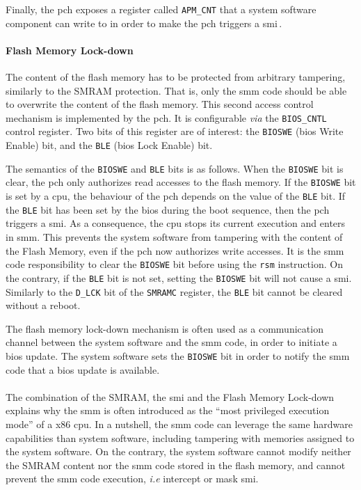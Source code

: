 Finally, the \ac{pch} exposes a register called \texttt{APM\_CNT} that a system
software component can write to in order to make the \ac{pch} triggers a
\ac{smi}\,\cite{intel2012pch}.

\paragraph{Flash Memory Lock-down}
%
The content of the flash memory has to be protected from arbitrary tampering,
similarly to the SMRAM protection.
%
That is, only the \ac{smm} code should be able to overwrite the content of the
flash memory.
%
This second access control mechanism is implemented by the \ac{pch}.
%
It is configurable \emph{via} the \texttt{BIOS\_CNTL} control register.
%
Two bits of this register are of interest: the \texttt{BIOSWE} (\ac{bios} Write
Enable) bit, and the \texttt{BLE} (\ac{bios} Lock Enable) bit.

The semantics of the \texttt{BIOSWE} and \texttt{BLE} bits is as follows.
%
When the \texttt{BIOSWE} bit is clear, the \ac{pch} only authorizes read
accesses to the flash memory.
%
If the \texttt{BIOSWE} bit is set by a \ac{cpu}, the behaviour of the \ac{pch}
depends on the value of the \texttt{BLE} bit.
%
If the \texttt{BLE} bit has been set by the \ac{bios} during the boot sequence,
then the \ac{pch} triggers a \ac{smi}.
%
As a consequence, the \ac{cpu} stops its current execution and enters in
\ac{smm}.
%
This prevents the system software from tampering with the content of the Flash
Memory, even if the \ac{pch} now authorizes write accesses.
%
It is the \ac{smm} code responsibility to clear the \texttt{BIOSWE} bit before
using the \texttt{rsm} instruction.
%
On the contrary, if the \texttt{BLE} bit is not set, setting the \texttt{BIOSWE}
bit will not cause a \ac{smi}.
%
Similarly to the \texttt{D\_LCK} bit of the \texttt{SMRAMC} register, the
\texttt{BLE} bit cannot be cleared without a reboot.


The flash memory lock-down mechanism is often used as a communication channel
between the system software and the \ac{smm} code, in order to initiate a
\ac{bios} update.
%
The system software sets the \texttt{BIOSWE} bit in order to notify the \ac{smm}
code that a \ac{bios} update is available.

\paragraph{}
%
The combination of the SMRAM, the \ac{smi} and the Flash Memory Lock-down
explains why the \ac{smm} is often introduced as the ``most privileged execution
mode'' of a x86 \ac{cpu}.
%
In a nutshell, the \ac{smm} code can leverage the same hardware capabilities
than system software, including tampering with memories assigned to the system
software.
%
On the contrary, the system software cannot modify neither the SMRAM content nor
the \ac{smm} code stored in the flash memory, and cannot prevent the \ac{smm}
code execution, \emph{i.e} intercept or mask \ac{smi}.



